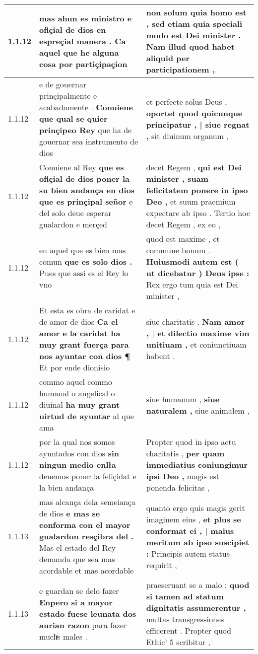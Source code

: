 \begin{tabular}{|p{1cm}|p{6.5cm}|p{6.5cm}|}
1.1.12 & mas ahun es ministro \textbf{ e ofiçial de dios en espreçial manera . } Ca aquel que he alguna cosa por partiçipaçion & non solum quia homo est , \textbf{ sed etiam quia speciali modo est Dei minister . } Nam illud quod habet aliquid per participationem , \\\hline
1.1.12 & e de gouernar prinçipalmente e acabadamente . \textbf{ Conuiene que qual se quier prinçipeo Rey } que ha de gouernar sea instrumento de dios & et perfecte solus Deus , \textbf{ oportet quod quicunque principatur , | siue regnat , } sit diuinum organum , \\\hline
1.1.12 & Conuiene al Rey \textbf{ que es ofiçial de dios poner la su bien andança en dios que es prinçipal señor } e del solo deue esperar gualardon e merçed & decet Regem , \textbf{ qui est Dei minister , suam felicitatem ponere in ipso Deo , } et suum praemium expectare ab ipso . Tertio hoc decet Regem , ex eo , \\\hline
1.1.12 & en aquel que es bien mas comun \textbf{ que es solo dios . } Pues que assi es el Rey lo vno & quod est maxime , et commune bonum . \textbf{ Huiusmodi autem est ( ut dicebatur ) Deus ipse : } Rex ergo tum quia est Dei minister , \\\hline
1.1.12 & Et esta es obra de caridat e de amor de dios \textbf{ Ca el amor e la caridat ha muy grant fuerça para nos ayuntar con dios ¶ } Et por ende dionisio & siue charitatis . \textbf{ Nam amor , | et dilectio maxime vim unitiuam , } et coniunctiuam habent . \\\hline
1.1.12 & commo aquel commo humanal o angelical o diuinal \textbf{ ha muy grant uirtud de ayuntar } al que ama & siue humanum , \textbf{ siue naturalem , } siue animalem , \\\hline
1.1.12 & por la qual nos somos ayuntados con dios \textbf{ sin ningun medio enlła } deuemos poner la feliçidat e la bien andança & Propter quod in ipso actu charitatis , \textbf{ per quam immediatius coniungimur ipsi Deo , } magis est ponenda felicitas , \\\hline
1.1.13 & mas alcança dela semeiança de dios \textbf{ e mas se conforma con el mayor gualardon resçibra del . } Mas el estado del Rey demanda que sea mas acordable et mas acordable & quanto ergo quis magis gerit imaginem eius , \textbf{ et plus se conformat ei , | maius meritum ab ipso suscipiet : } Principis autem status requirit , \\\hline
1.1.13 & e guardan se delo fazer \textbf{ Enpero si a mayor estado fuese leunata dos aurian razon } para fazer muchͣs males . & praeseruant se a malo : \textbf{ quod si tamen ad statum dignitatis assumerentur , } multas transgressiones efficerent . Propter quod Ethic’ 5 scribitur , \\\hline

\end{tabular}
